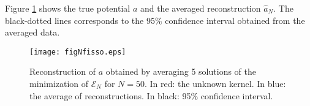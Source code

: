Figure \ref{fixedN} shows the true potential $a$ and the averaged reconstruction $\widehat{a}_N$. The black-dotted lines corresponds to the 95\% confidence interval obtained from the averaged data.

\begin{figure}[h!]
\begin{center}
\texttt{[image: figNfisso.eps]}
\end{center}
\caption{Reconstruction of $a$ obtained by averaging 5 solutions of the minimization of $\mathcal{E}_N$ for $N = 50$. In red: the unknown kernel. In blue: the average of reconstructions. In black: 95\% confidence interval.}\label{fixedN}
\end{figure}